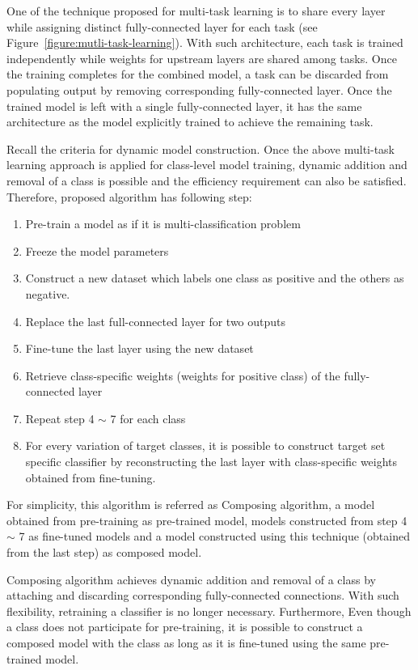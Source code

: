 \documentclass{article}
\begin{document}
One of the technique proposed for multi-task learning is to share every layer while assigning distinct fully-connected layer for each task (see Figure~\ref{figure:mutli-task-learning}). With such architecture, each task is trained independently while weights for upstream layers are shared among tasks. Once the training completes for the combined model, a task can be discarded from populating output by removing corresponding fully-connected layer. Once the trained model is left with a single fully-connected layer, it has the same architecture as the model explicitly trained to achieve the remaining task.

Recall the criteria for dynamic model construction. Once the above multi-task learning approach is applied for class-level model training, dynamic addition and removal of a class is possible and the efficiency requirement can also be satisfied. Therefore, proposed algorithm has following step:

\begin{enumerate}
    \item Pre-train a model as if it is multi-classification problem
    \item Freeze the model parameters
    \item Construct a new dataset which labels one class as positive and the others as negative.
    \item Replace the last full-connected layer for two outputs
    \item Fine-tune the last layer using the new dataset
    \item Retrieve class-specific weights (weights for positive class) of the fully-connected layer
    \item Repeat step 4 $\sim$ 7 for each class
    \item For every variation of target classes, it is possible to construct target set specific classifier by reconstructing the last layer with class-specific weights obtained from fine-tuning.
\end{enumerate}

For simplicity, this algorithm is referred as Composing algorithm, a model obtained from pre-training as pre-trained model, models constructed from step 4 $\sim$ 7 as fine-tuned models and a model constructed using this technique (obtained from the last step) as composed model.

Composing algorithm achieves dynamic addition and removal of a class by attaching and discarding corresponding fully-connected connections. With such flexibility, retraining a classifier is no longer necessary. Furthermore, Even though a class does not participate for pre-training, it is possible to construct a composed model with the class as long as it is fine-tuned using the same pre-trained model.
\end{document}
